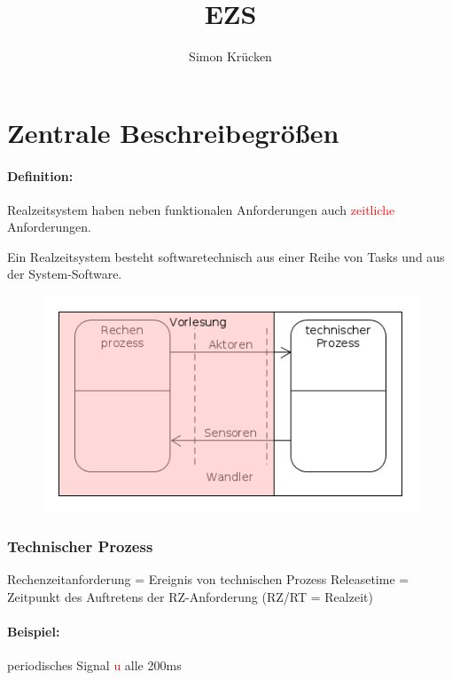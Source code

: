 \documentclass[12pt,a4paper,oneside,ngerman]{article}
\title{EZS}
\author{Simon Krücken}
\begin{document}
    
\begin{titlepage}
\end{titlepage}
\tableofcontents
\pagebreak

\section[Zentrale Beschreibegrößen]{Zentrale Beschreibegrößen}

\paragraph[Definition]{Definition:}
Realzeitsystem haben neben funktionalen Anforderungen auch \textcolor{red}{zeitliche} Anforderungen.

Ein Realzeitsystem besteht softwaretechnisch aus einer Reihe von Tasks und aus der System-Software.

\begin{figure}[ht]
	\centering
	\includegraphics[scale=0.5]{umlet/rt_control.png}
\end{figure}

\subsubsection{Technischer Prozess}
Rechenzeitanforderung = Ereignis von technischen Prozess
Releasetime = Zeitpunkt des Auftretens der RZ-Anforderung (RZ/RT = Realzeit)

\paragraph[Beispiel]{Beispiel:}
periodisches Signal \textcolor{red}{u} alle 200ms
\end{document}

